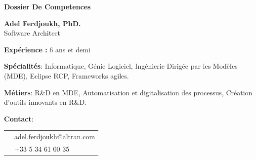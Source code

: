 \thispagestyle{empty}

\renewcommand\refname{~}

\begin{center}
\par\textbf{\huge \sc Dossier De Competences}
\end{center}

\vspace{.5cm}

\begin{minipage}{0.45\textwidth}
\textbf{Adel Ferdjoukh, PhD.} \\ 
Software Architect

\vspace{.3cm}


\textbf{Expérience :} 6 ans et demi 

\medskip
{\bf Spécialités}: Informatique, Génie Logiciel, Ingénierie Dirigée par les Modèles (MDE), Eclipse RCP, Frameworks agiles.

\medskip
{\bf Métiers}: R\&D en MDE, Automatisation et digitalisation des processus, Création d’outils innovants en R\&D.

\medskip
{\bf Contact}:

\medskip

\begin{tabular}{cl}
\email{} & adel.ferdjoukh@altran.com\\
\phone{} & +33 5 34 61 00 35\\
\end{tabular}



\end{minipage}
\hfill

